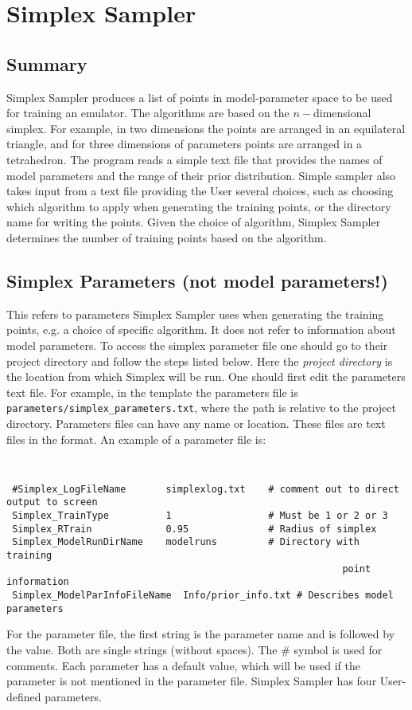 \documentclass[main.tex]{subfiles}
\begin{document}
\setcounter{section}{2}

\section{Simplex Sampler}

\subsection{Summary}
Simplex Sampler produces a list of points in model-parameter space to be used for training an emulator. The algorithms are based on the $n-$dimensional simplex. For example, in two dimensions the points are arranged in an equilateral triangle, and for three dimensions of parameters points are arranged in a tetrahedron. The program reads a simple text file that provides the names of model parameters and the range of their prior distribution. Simple sampler also takes input from a text file providing the User several choices, such as choosing which algorithm to apply when generating the training points, or the directory name for writing the points. Given the choice of algorithm, Simplex Sampler determines the number of training points based on the algorithm.

\subsection{Simplex Parameters (not model parameters!)}

This refers to parameters Simplex Sampler uses when generating the training points, e.g. a choice of specific algorithm. It does not refer to information about model parameters. To access the simplex parameter file one should go to their project directory and follow the steps listed below. Here the {\it project directory} is the location from which Simplex will be run. One should first edit the parameters text file. For example, in the template the parameters file is {\tt parameters/simplex\_parameters.txt}, where the path is relative to the project directory.
Parameters files can have any name or location. These files are text files in the format. An example of a parameter file is:
{\tt
\begin{verbatim}
 #Simplex_LogFileName       simplexlog.txt    # comment out to direct output to screen
 Simplex_TrainType          1                 # Must be 1 or 2 or 3
 Simplex_RTrain             0.95              # Radius of simplex
 Simplex_ModelRunDirName    modelruns         # Directory with training
                                                           point information
 Simplex_ModelParInfoFileName  Info/prior_info.txt # Describes model parameters
\end{verbatim}
}
For the parameter file, the first string is the parameter name and is followed by the value. Both are single strings (without spaces). The \# symbol is used for comments. Each parameter has a default value, which will be used if the parameter is not mentioned in the parameter file.  Simplex Sampler has four User-defined parameters.
    
\end{document}
